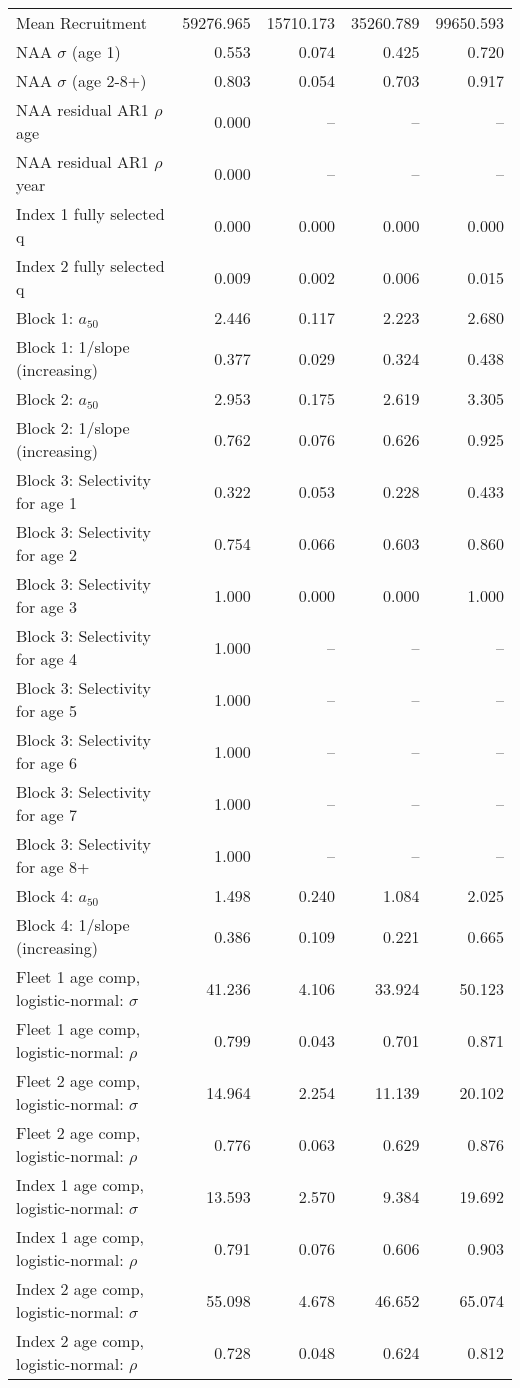 \documentclass[
]{article}
\begin{document}
\begin{landscape}
\begin{longtable}[t]{lrrrr}
\endfoot
\bottomrule
\endlastfoot
Mean Recruitment & 59276.965 & 15710.173 & 35260.789 & 99650.593\\
NAA $\sigma$ (age 1) & 0.553 & 0.074 & 0.425 & 0.720\\
NAA $\sigma$ (age 2-8+) & 0.803 & 0.054 & 0.703 & 0.917\\
NAA residual AR1 $\rho$ age & 0.000 & -- & -- & --\\
NAA residual AR1 $\rho$ year & 0.000 & -- & -- & --\\
\addlinespace
Index 1 fully selected q & 0.000 & 0.000 & 0.000 & 0.000\\
Index 2 fully selected q & 0.009 & 0.002 & 0.006 & 0.015\\
Block 1: $a_{50}$ & 2.446 & 0.117 & 2.223 & 2.680\\
Block 1: 1/slope (increasing) & 0.377 & 0.029 & 0.324 & 0.438\\
Block 2: $a_{50}$ & 2.953 & 0.175 & 2.619 & 3.305\\
\addlinespace
Block 2: 1/slope (increasing) & 0.762 & 0.076 & 0.626 & 0.925\\
Block 3: Selectivity for age 1 & 0.322 & 0.053 & 0.228 & 0.433\\
Block 3: Selectivity for age 2 & 0.754 & 0.066 & 0.603 & 0.860\\
Block 3: Selectivity for age 3 & 1.000 & 0.000 & 0.000 & 1.000\\
Block 3: Selectivity for age 4 & 1.000 & -- & -- & --\\
\addlinespace
Block 3: Selectivity for age 5 & 1.000 & -- & -- & --\\
Block 3: Selectivity for age 6 & 1.000 & -- & -- & --\\
Block 3: Selectivity for age 7 & 1.000 & -- & -- & --\\
Block 3: Selectivity for age 8+ & 1.000 & -- & -- & --\\
Block 4: $a_{50}$ & 1.498 & 0.240 & 1.084 & 2.025\\
\addlinespace
Block 4: 1/slope (increasing) & 0.386 & 0.109 & 0.221 & 0.665\\
Fleet 1 age comp, logistic-normal: $\sigma$ & 41.236 & 4.106 & 33.924 & 50.123\\
Fleet 1 age comp, logistic-normal: $\rho$ & 0.799 & 0.043 & 0.701 & 0.871\\
Fleet 2 age comp, logistic-normal: $\sigma$ & 14.964 & 2.254 & 11.139 & 20.102\\
Fleet 2 age comp, logistic-normal: $\rho$ & 0.776 & 0.063 & 0.629 & 0.876\\
\addlinespace
Index 1 age comp, logistic-normal: $\sigma$ & 13.593 & 2.570 & 9.384 & 19.692\\
Index 1 age comp, logistic-normal: $\rho$ & 0.791 & 0.076 & 0.606 & 0.903\\
Index 2 age comp, logistic-normal: $\sigma$ & 55.098 & 4.678 & 46.652 & 65.074\\
Index 2 age comp, logistic-normal: $\rho$ & 0.728 & 0.048 & 0.624 & 0.812\\*
\end{longtable}
\end{landscape}
\end{document}
